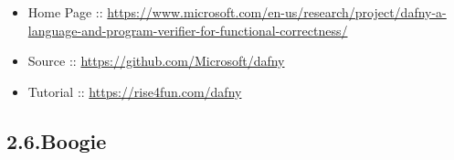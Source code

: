 \documentclass[12pt,twoside]{article}
\begin{document}
\begin{itemize}[noitemsep,topsep=\mdcompacttopsep]%

\item{}Home Page :: \href{https://www.microsoft.com/en-us/research/project/dafny-a-language-and-program-verifier-for-functional-correctness/}{{\ttfamily https://\hspace{0pt}www.\hspace{0pt}microsoft.\hspace{0pt}com/\hspace{0pt}en-\hspace{0pt}us/\hspace{0pt}research/\hspace{0pt}project/\hspace{0pt}dafny-\hspace{0pt}a-\hspace{0pt}language-\hspace{0pt}and-\hspace{0pt}program-\hspace{0pt}verifier-\hspace{0pt}for-\hspace{0pt}functional-\hspace{0pt}correctness/\hspace{0pt}}}%

\item{}Source :: \href{https://github.com/Microsoft/dafny}{{\ttfamily https://\hspace{0pt}github.\hspace{0pt}com/\hspace{0pt}Microsoft/\hspace{0pt}dafny}}%

\item{}Tutorial :: \href{https://rise4fun.com/dafny}{{\ttfamily https://\hspace{0pt}rise4fun.\hspace{0pt}com/\hspace{0pt}dafny}}%
\end{itemize}%

\subsection{2.6.\hspace*{0.5em}Boogie}\label{sec-boogie}%
\end{document}
